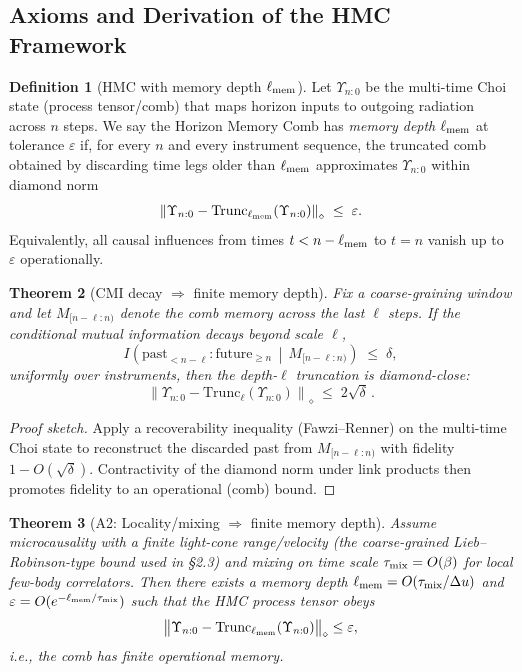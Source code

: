 \documentclass[11pt,a4paper]{article}
\newcommand{\normD}[1]{\left\lVert #1 \right\rVert_{\diamond}}
\newcommand{\Ddiamond}[1]{\normD{#1}}
\newcommand{\HMC}{\textsc{HMC}\xspace}
\theoremstyle{plain}
\newtheorem{theorem}{Theorem}
\theoremstyle{definition}
\newtheorem{definition}[theorem]{Definition}
\theoremstyle{remark}
\begin{document}
\subsection{Axioms and Derivation of the \HMC{} Framework}
\label{sec:assumptions}

\begin{definition}[\HMC{} with memory depth $\ell_{\rm mem}$]\label{def:hmc-memory-depth}
Let $\Upsilon_{n{:}0}$ be the multi-time Choi state (process tensor/comb) that maps horizon inputs to outgoing radiation across $n$ steps.
We say the Horizon Memory Comb has \emph{memory depth} $\ell_{\rm mem}$ at tolerance $\varepsilon$ if, for every $n$ and every instrument sequence, the truncated comb
obtained by discarding time legs older than $\ell_{\rm mem}$ approximates $\Upsilon_{n{:}0}$ within diamond norm
\[
  \Ddiamond{\Upsilon_{n{:}0}-\mathrm{Trunc}_{\ell_{\rm mem}}(\Upsilon_{n{:}0})}\;\le\;\varepsilon.
\]
Equivalently, all causal influences from times $t<n-\ell_{\rm mem}$ to $t=n$ vanish up to $\varepsilon$ operationally.
\end{definition}

\begin{theorem}[CMI decay $\Rightarrow$ finite memory depth]\label{thm:cmi-to-depth}
Fix a coarse-graining window and let $M_{[n-\ell{:}n)}$ denote the comb memory across the last $\ell$ steps.
If the conditional mutual information decays beyond scale $\ell$,
\[
I\!\left( \text{past}_{<n-\ell} : \text{future}_{\ge n} \,\middle|\, M_{[n-\ell{:}n)} \right)\;\le\;\delta,
\]
uniformly over instruments, then the depth-$\ell$ truncation is diamond-close:
\[
\Ddiamond{\Upsilon_{n{:}0}-\mathrm{Trunc}_{\ell}(\Upsilon_{n{:}0})}\;\le\;2\sqrt{\delta}\,.
\]
\end{theorem}
\begin{proof}[Proof sketch]
Apply a recoverability inequality (Fawzi--Renner) on the multi-time Choi state to reconstruct the discarded past from $M_{[n-\ell{:}n)}$ with fidelity $1-O(\sqrt{\delta})$.
Contractivity of the diamond norm under link products then promotes fidelity to an operational (comb) bound.
\end{proof}

\begin{theorem}[A2: Locality/mixing $\Rightarrow$ finite memory depth]\label{thm:A2}
Assume microcausality with a finite light-cone range/velocity (the coarse-grained Lieb--Robinson-type bound used in §2.3) and mixing on time scale $\tau_{\rm mix}=O(\beta)$ for local few-body correlators. Then there exists a memory depth $\ell_{\rm mem}=O(\tau_{\rm mix}/\Delta u)$ and $\varepsilon=O(e^{-\ell_{\rm mem}/\tau_{\rm mix}})$ such that the HMC process tensor obeys
\[
\bigl\|\Upsilon_{n:0}-\mathrm{Trunc}_{\ell_{\rm mem}}(\Upsilon_{n:0})\bigr\|_{\diamond}\le \varepsilon,
\]
i.e., the comb has finite operational memory.
\end{theorem}
\end{document}

